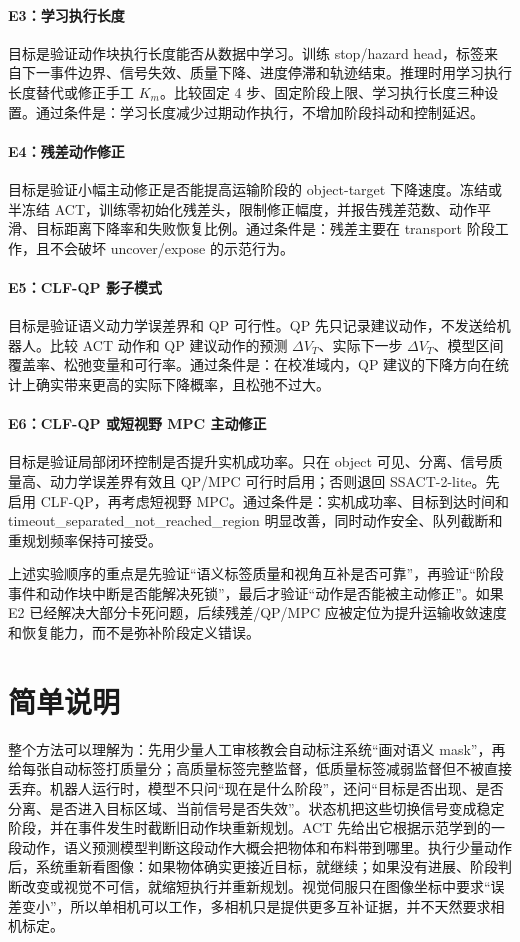 \documentclass[UTF8,a4paper,11pt]{ctexart}
\begin{document}
\paragraph{E3：学习执行长度}
目标是验证动作块执行长度能否从数据中学习。训练 stop/hazard head，标签来自下一事件边界、信号失效、质量下降、进度停滞和轨迹结束。推理时用学习执行长度替代或修正手工 $K_m$。比较固定 4 步、固定阶段上限、学习执行长度三种设置。通过条件是：学习长度减少过期动作执行，不增加阶段抖动和控制延迟。

\paragraph{E4：残差动作修正}
目标是验证小幅主动修正是否能提高运输阶段的 object-target 下降速度。冻结或半冻结 ACT，训练零初始化残差头，限制修正幅度，并报告残差范数、动作平滑、目标距离下降率和失败恢复比例。通过条件是：残差主要在 transport 阶段工作，且不会破坏 uncover/expose 的示范行为。

\paragraph{E5：CLF-QP 影子模式}
目标是验证语义动力学误差界和 QP 可行性。QP 先只记录建议动作，不发送给机器人。比较 ACT 动作和 QP 建议动作的预测 $\Delta V_T$、实际下一步 $\Delta V_T$、模型区间覆盖率、松弛变量和可行率。通过条件是：在校准域内，QP 建议的下降方向在统计上确实带来更高的实际下降概率，且松弛不过大。

\paragraph{E6：CLF-QP 或短视野 MPC 主动修正}
目标是验证局部闭环控制是否提升实机成功率。只在 object 可见、分离、信号质量高、动力学误差界有效且 QP/MPC 可行时启用；否则退回 SSACT-2-lite。先启用 CLF-QP，再考虑短视野 MPC。通过条件是：实机成功率、目标到达时间和 timeout\_separated\_not\_reached\_region 明显改善，同时动作安全、队列截断和重规划频率保持可接受。

上述实验顺序的重点是先验证“语义标签质量和视角互补是否可靠”，再验证“阶段事件和动作块中断是否能解决死锁”，最后才验证“动作是否能被主动修正”。如果 E2 已经解决大部分卡死问题，后续残差/QP/MPC 应被定位为提升运输收敛速度和恢复能力，而不是弥补阶段定义错误。

\section{简单说明}

整个方法可以理解为：先用少量人工审核教会自动标注系统“画对语义 mask”，再给每张自动标签打质量分；高质量标签完整监督，低质量标签减弱监督但不被直接丢弃。机器人运行时，模型不只问“现在是什么阶段”，还问“目标是否出现、是否分离、是否进入目标区域、当前信号是否失效”。状态机把这些切换信号变成稳定阶段，并在事件发生时截断旧动作块重新规划。ACT 先给出它根据示范学到的一段动作，语义预测模型判断这段动作大概会把物体和布料带到哪里。执行少量动作后，系统重新看图像：如果物体确实更接近目标，就继续；如果没有进展、阶段判断改变或视觉不可信，就缩短执行并重新规划。视觉伺服只在图像坐标中要求“误差变小”，所以单相机可以工作，多相机只是提供更多互补证据，并不天然要求相机标定。
\end{document}
